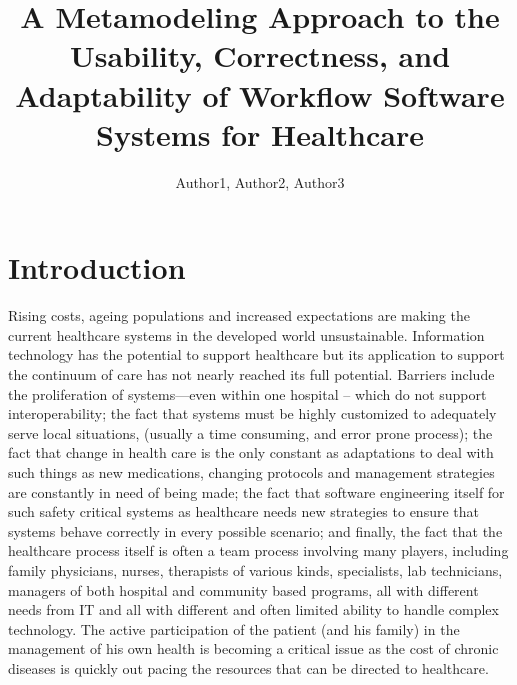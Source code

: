 \documentclass[a4paper]{llncs}
\begin{document}

\title{A Metamodeling Approach to the Usability, Correctness, and Adaptability of Workflow Software Systems for Healthcare}


\author{Author1, Author2, Author3 }

\maketitle

\begin{abstract}


\end{abstract}


\section{Introduction}

Rising costs, ageing populations and increased expectations are making the current healthcare systems in the developed world unsustainable.  
Information technology has the potential to support healthcare but its application to support the continuum of care has not nearly reached its full potential.  
Barriers include the proliferation of systems—even within one hospital -- which do not support interoperability; the fact that systems must be highly 
customized to adequately serve local situations, (usually a time consuming, and error prone  process); the fact that change in health care is the only constant as 
adaptations to deal with such things as new medications, changing protocols  and management strategies are constantly in need of being made; the fact that software engineering 
itself for such safety critical systems as healthcare needs new strategies to ensure that systems behave correctly in every possible  scenario;  and finally, the fact that 
the healthcare process itself is often a team process involving many players, including family physicians, nurses, therapists of various kinds, specialists, lab technicians, 
managers of both hospital and  community based programs, all with different needs from IT and all with different and often limited ability to handle complex technology.  
The active participation of the patient (and his family) in the management of his own health is becoming a critical issue as the cost of chronic diseases is quickly out pacing 
the resources that can be directed to healthcare.
\end{document}

